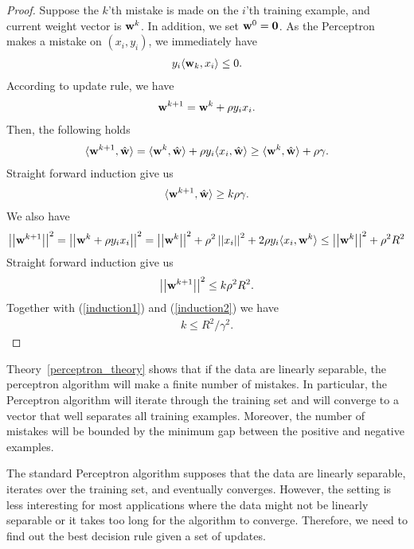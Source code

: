 \begin{proof}
	Suppose the $k$'th mistake is made on the $i$'th training example, and current weight vector is $\mathbf {w}^k$.
	In addition, we set $\mathbf {w}^0=\mathbf {0}$.
	As the Perceptron makes a mistake on $(x_i,y_i)$, we immediately have
	\begin{align*}
		y_i\langle \mathbf {w}_k, x_i \rangle \le 0.
	\end{align*}
	According to update rule, we have
	\begin{align*}
		\mathbf {w}^{k+1} = \mathbf {w}^{k} + \rho y_ix_i.
	\end{align*}
	Then, the following holds
	\begin{align*}
		\langle \mathbf {w}^{k+1}, \hat{\mathbf {w}} \rangle = \langle \mathbf {w}^k, \hat{\mathbf {w}} \rangle + \rho y_i\langle x_i, \hat{\mathbf {w}} \rangle \ge \langle \mathbf {w}^k, \hat{\mathbf {w}} \rangle + \rho\gamma.
	\end{align*}
	Straight forward induction give us
	\begin{align}
		\langle \mathbf {w}^{k+1}, \hat{\mathbf {w}} \rangle\ge k\rho\gamma. \label{induction1}
	\end{align}
	We also have
	\begin{align*}
		\left|\left| \mathbf {w}^{k+1} \right|\right|^2 
		= \left|\left| \mathbf {w}^{k} + \rho y_ix_i \right|\right|^2
		= \left|\left| \mathbf {w}^k \right|\right|^2 + \rho^2\left|\left| x_i \right|\right|^2 + 2\rho y_i\langle x_i, \mathbf {w}^k \rangle
		\le \left|\left| \mathbf {w}^k \right|\right|^2 + \rho^2R^2
	\end{align*}
	Straight forward induction give us
	\begin{align}
		\left|\left| \mathbf {w}^{k+1} \right|\right|^2\le k\rho^2R^2. \label{induction2}
	\end{align}
	Together with (\ref{induction1}) and (\ref{induction2}) we have
	\begin{align*}
		k\le{R^2}/{\gamma^2}.
	\end{align*}
\end{proof}
Theory~\ref{perceptron_theory} shows that if the data are linearly separable, the perceptron algorithm will make a finite number of mistakes. 
In particular, the Perceptron algorithm will iterate through the training set and will converge to a vector that well separates all training examples.
Moreover, the number of mistakes will be bounded by the minimum gap between the positive and negative examples.

The standard Perceptron algorithm supposes that the data are linearly separable, iterates over the training set, and eventually converges.
However, the setting is less interesting for most applications where the data might not be linearly separable or it takes too long for the algorithm to converge.
Therefore, we need to find out the best decision rule given a set of updates.

